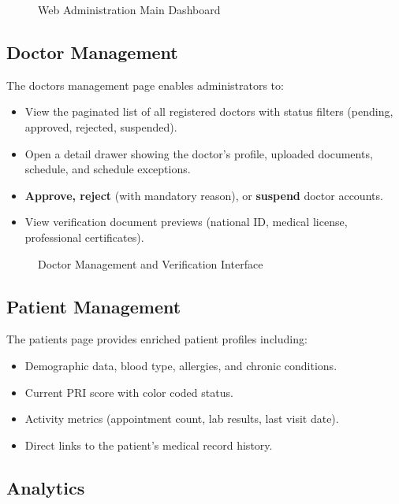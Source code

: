 \documentclass[12pt,a4paper,oneside]{report}
\begin{document}
\begin{figure}[H]
    \centering
    \caption{Web Administration Main Dashboard}
    \label{fig:screen admin dashboard}
\end{figure}

\subsection{Doctor Management}

The doctors management page enables administrators to:

\begin{itemize}
    \item View the paginated list of all registered doctors with status filters (pending, approved, rejected, suspended).
    \item Open a detail drawer showing the doctor's profile, uploaded documents, schedule, and schedule exceptions.
    \item \textbf{Approve, reject} (with mandatory reason), or \textbf{suspend} doctor accounts.
    \item View verification document previews (national ID, medical license, professional certificates).
\end{itemize}

\begin{figure}[H]
    \centering
    \caption{Doctor Management and Verification Interface}
    \label{fig:screen admin doctors}
\end{figure}

\subsection{Patient Management}

The patients page provides enriched patient profiles including:

\begin{itemize}
    \item Demographic data, blood type, allergies, and chronic conditions.
    \item Current PRI score with color coded status.
    \item Activity metrics (appointment count, lab results, last visit date).
    \item Direct links to the patient's medical record history.
\end{itemize}

\subsection{Analytics}
\end{document}
